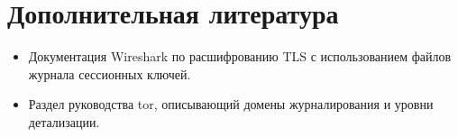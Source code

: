 \section*{Дополнительная литература}
\begin{itemize}
  \item Документация Wireshark по расшифрованию TLS с использованием файлов журнала сессионных ключей.
  \item Раздел  руководства tor, описывающий домены журналирования и уровни детализации.
\end{itemize}
